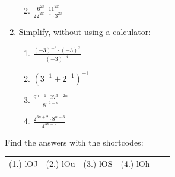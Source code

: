 \begin{enumerate}[noitemsep, label=\textbf{\arabic*}. ]
\begin{enumerate}[noitemsep, label=\textbf{\alph*}. ]
    \label{m38359*uid50}\item \begin{math}\frac{{6}^{2x}\ensuremath{\cdot}{11}^{2x}}{{22}^{2x-1}\ensuremath{\cdot}{3}^{2x}}\end{math}
\end{enumerate}
                \label{m38359*uid51}\item Simplify, without using a calculator:
\label{m38359*id68759}\begin{enumerate}[noitemsep, label=\textbf{\alph*}. ] 
            \label{m38359*uid52}\item \begin{math}\frac{{\left(-3\right)}^{-3}\ensuremath{\cdot}{\left(-3\right)}^{2}}{{\left(-3\right)}^{-4}}\end{math}\newline
    \label{m38359*uid53}\item \begin{math}{\left({3}^{-1}+{2}^{-1}\right)}^{-1}\end{math}\newline
    \label{m38359*uid54}\item \begin{math}\frac{{9}^{n-1}\ensuremath{\cdot}{27}^{3-2n}}{{81}^{2-n}}\end{math}\newline
    \label{m38359*uid55}\item \begin{math}\frac{{2}^{3n+2}\ensuremath{\cdot}{8}^{n-3}}{{4}^{3n-2}}\end{math}
\end{enumerate}
                \end{enumerate}
  \label{m38359**end}
\par {} Find the answers with the shortcodes:
 \par \begin{tabular}[h]{cccccc}
 (1.) lOJ  &  (2.) lOu  &  (3.) lOS  &  (4.) lOh  & \end{tabular}
